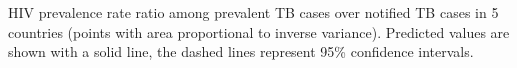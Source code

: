 \label{fig:hivratio}HIV prevalence rate ratio among prevalent TB cases over notified TB cases in 5 countries (points with area proportional to inverse variance). Predicted values are shown with a solid line, the dashed lines represent 95\% confidence intervals.